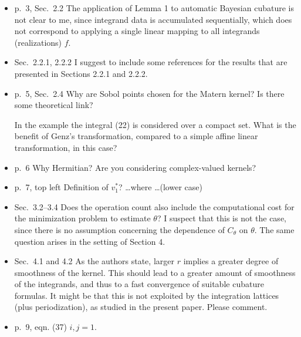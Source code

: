 \documentclass{amsart}
\begin{document}
\begin{itemize}
\item p.\ 3, Sec.\ 2.2 The application of Lemma 1 to automatic Bayesian cubature is not clear to me, since integrand data is accumulated sequentially, which does not correspond to applying a single linear mapping to all integrands (realizations) $f$.

\item Sec.\ 2.2.1, 2.2.2 I suggest to include some references for the results that are presented in Sections 2.2.1 and 2.2.2.

\item p.\ 5, Sec.\ 2.4 Why are Sobol points chosen for the Matern kernel? Is there some theoretical link?  

In the example the integral (22) is considered over a compact set. What is the benefit of Genz’s transformation, compared to a simple affine linear transformation, in this case?

\item p.\ 6 Why Hermitian? Are you considering complex-valued kernels? 

\item p.\ 7, top left Definition of $v_1^*$? \ldots where \ldots (lower case) 

\item Sec.\ 3.2--3.4 Does the operation count also include the computational cost for the minimization problem to estimate $\theta$? I suspect that this is not the case, since there is no assumption concerning the dependence of $C_\theta$ on $\theta$. The same question arises in the setting of Section 4.  

\item Sec.\ 4.1 and 4.2 As the authors state, larger $r$ implies a greater degree of smoothness of the kernel. This should lead to a greater amount of smoothness of the integrands, and thus to a fast convergence of suitable cubature formulas. It might be that this is not exploited by the integration lattices (plus periodization), as studied in the present paper. Please comment.

\item p.\ 9, eqn. (37) $i, j = 1$. 


\end{itemize}
\end{document}
